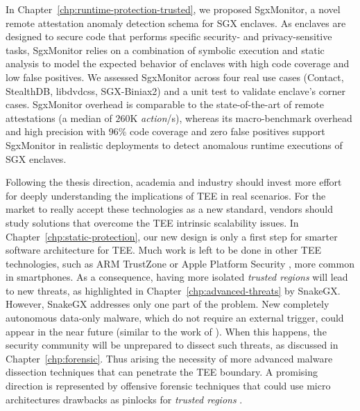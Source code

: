 In Chapter~\ref{chp:runtime-protection-trusted}, we proposed SgxMonitor, a 
novel remote attestation anomaly detection schema for SGX enclaves. As enclaves 
are designed to secure code that performs specific security- and 
privacy-sensitive tasks, SgxMonitor relies on a combination of symbolic 
execution and static analysis to model the expected behavior of enclaves with 
high code coverage and low false positives.  
We assessed SgxMonitor across four real use cases (\ie \textsf{Contact}, 
\textsf{StealthDB}, \textsf{libdvdcss}, \textsf{SGX-Biniax2}) and a 
\textsf{unit test} to validate enclave's corner cases. SgxMonitor overhead is 
comparable to the state-of-the-art of remote attestations (a median of $260$K
\emph{action}/s), whereas its macro-benchmark overhead and high precision
with $96$\% code coverage and zero false positives support SgxMonitor in 
realistic deployments to detect anomalous runtime executions of SGX enclaves.

\vspace{0.3cm}
Following the thesis direction, academia and industry should invest more 
effort for deeply understanding the implications of TEE in real scenarios.
For the market to really accept these technologies as a new standard, vendors 
should study solutions that overcome the TEE intrinsic scalability issues. 
In Chapter~\ref{chp:static-protection}, our new design is only a first step for 
smarter software architecture for TEE.
Much work is left to be done in other TEE technologies, such as ARM TrustZone 
\citep{arm-trustzone} or Apple Platform Security \citep{apple-enclave}, more 
common in smartphones.
As a consequence, having more isolated \emph{trusted regions} will lead to new 
threats, as highlighted in Chapter~\ref{chp:advanced-threats} by SnakeGX.
However, SnakeGX addresses only one part of the problem. 
New completely autonomous data-only malware, which do not require an external 
trigger, could appear in the near future (similar to the work of 
\cite{vogl2014persistent}).
When this happens, the security community will be unprepared to dissect such 
threats, as discussed in Chapter~\ref{chp:forensic}.
Thus arising the necessity of more advanced malware dissection techniques that
can penetrate the TEE boundary. A promising direction is represented by 
offensive forensic techniques that could use micro 
architectures drawbacks as pinlocks for \emph{trusted regions} 
\citep{offensiveforensic}.

